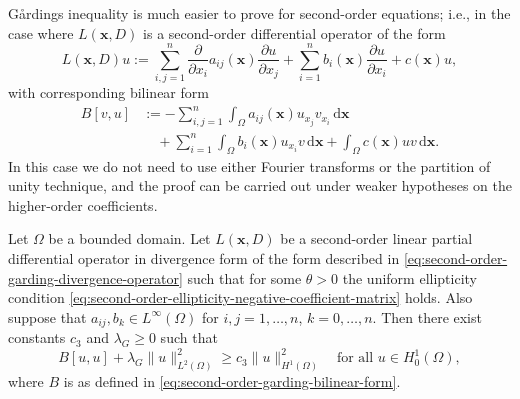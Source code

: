 Gårding\textquotesingle s inequality is much easier to prove for second-order equations; i.e., in the case where $L(\bm{x},D)$ is a second-order differential operator of the form
\begin{equation}\label{eq:second-order-garding-divergence-operator}
L(\bm{x},D)u:=\sum_{i,j=1}^n\frac{\partial}{\partial x_i}a_{ij}(\bm{x})\frac{\partial u}{\partial x_j}+\sum_{i=1}^nb_i(\bm{x})\frac{\partial u}{\partial x_i}+c(\bm{x})u,
\end{equation}
with corresponding bilinear form
\begin{equation}\label{eq:second-order-garding-bilinear-form}
\begin{aligned}
B[v,u]&:=-\sum_{i,j=1}^n\int_\Omega a_{ij}(\bm{x})u_{x_j}v_{x_i}\,\mathrm{d}\bm{x}\\
&\quad+\sum_{i=1}^n\int_\Omega b_i(\bm{x})u_{x_i}v\,\mathrm{d}\bm{x}+\int_\Omega c(\bm{x})uv\,\mathrm{d}\bm{x}.
\end{aligned}
\end{equation}
In this case we do not need to use either Fourier transforms or the partition of unity technique, and the proof can be carried out under weaker hypotheses on the higher-order coefficients.

\begin{Theorem}
\label{thm:second-order-garding-inequality}
Let $\Omega$ be a bounded domain. Let $L(\bm{x},D)$ be a second-order linear partial differential operator in divergence form of the form described in \eqref{eq:second-order-garding-divergence-operator} such that for some $\theta>0$ the uniform ellipticity condition \eqref{eq:second-order-ellipticity-negative-coefficient-matrix} holds. Also suppose that $a_{ij},b_k\in L^\infty(\Omega)$ for $i,j=1,\ldots,n$, $k=0,\ldots,n$. Then there exist constants $c_3$ and $\lambda_G\geq0$ such that
\begin{equation}\label{eq:second-order-garding-energy-inequality}
B[u,u]+\lambda_G\|u\|_{L^2(\Omega)}^2\geq c_3\|u\|_{H^1(\Omega)}^2\quad\text{for all }u\in H_0^1(\Omega),
\end{equation}
where $B$ is as defined in \eqref{eq:second-order-garding-bilinear-form}.
\end{Theorem}

